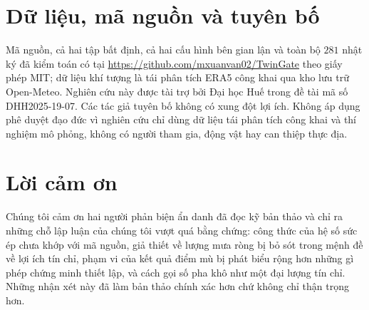 

\section*{Dữ liệu, mã nguồn và tuyên bố}

Mã nguồn, cả hai tập bất định, cả hai cấu hình bên gian lận và toàn bộ $281$ nhật ký
đã kiểm toán có tại \url{https://github.com/mxuanvan02/TwinGate} theo giấy phép MIT; dữ liệu khí tượng là tái phân tích ERA5 công khai qua kho lưu trữ
Open-Meteo. Nghiên cứu này được tài trợ bởi Đại học Huế trong đề tài mã số
DHH2025-19-07. Các tác giả tuyên bố không có xung đột lợi ích. Không áp dụng phê duyệt đạo đức vì nghiên cứu chỉ dùng dữ liệu tái phân tích công khai và thí
nghiệm mô phỏng, không có người tham gia, động vật hay can thiệp thực địa.

\section*{Lời cảm ơn}

Chúng tôi cảm ơn hai người phản biện ẩn danh đã đọc kỹ bản thảo và chỉ ra những chỗ
lập luận của chúng tôi vượt quá bằng chứng: công thức của hệ số sức ép chưa khớp với
mã nguồn, giả thiết về lượng mưa ròng bị bỏ sót trong mệnh đề về lợi ích tín chỉ,
phạm vi của kết quả điểm mù bị phát biểu rộng hơn những gì phép chứng minh thiết lập,
và cách gọi số pha khô như một đại lượng tín chỉ. Những nhận xét này đã làm bản thảo
chính xác hơn chứ không chỉ thận trọng hơn.

